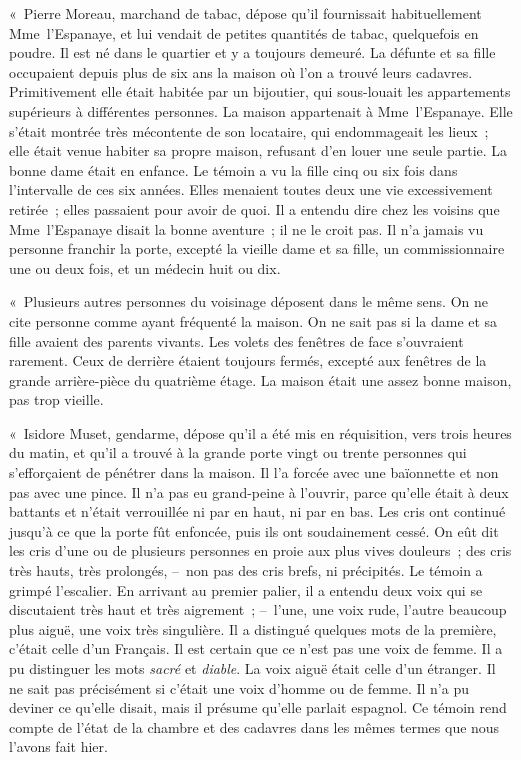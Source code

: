 \documentclass[french,twoside]{book} %
\begin{document}
« Pierre Moreau, marchand de tabac, dépose qu’il fournissait habituellement Mme l’Espanaye, et lui vendait de petites quantités de tabac, quelquefois en poudre. Il est né dans le quartier et y a toujours demeuré. La défunte et sa fille occupaient depuis plus de six ans la maison où l’on a trouvé leurs cadavres. Primitivement elle était habitée par un bijoutier, qui sous-louait les appartements supérieurs à différentes personnes. La maison appartenait à Mme l’Espanaye. Elle s’était montrée très mécontente de son locataire, qui endommageait les lieux ; elle était venue habiter sa propre maison, refusant d’en louer une seule partie. La bonne dame était en enfance. Le témoin a vu la fille cinq ou six fois dans l’intervalle de ces six années. Elles menaient toutes deux une vie excessivement retirée ; elles passaient pour avoir de quoi. Il a entendu dire chez les voisins que Mme l’Espanaye disait la bonne aventure ; il ne le croit pas. Il n’a jamais vu personne franchir la porte, excepté la vieille dame et sa fille, un commissionnaire une ou deux fois, et un médecin huit ou dix.\par
« Plusieurs autres personnes du voisinage déposent dans le même sens. On ne cite personne comme ayant fréquenté la maison. On ne sait pas si la dame et sa fille avaient des parents vivants. Les volets des fenêtres de face s’ouvraient rarement. Ceux de derrière étaient toujours fermés, excepté aux fenêtres de la grande arrière-pièce du quatrième étage. La maison était une assez bonne maison, pas trop vieille.\par
« Isidore Muset, gendarme, dépose qu’il a été mis en réquisition, vers trois heures du matin, et qu’il a trouvé à la grande porte vingt ou trente personnes qui s’efforçaient de pénétrer dans la maison. Il l’a forcée avec une baïonnette et non pas avec une pince. Il n’a pas eu grand-peine à l’ouvrir, parce qu’elle était à deux battants et n’était verrouillée ni par en haut, ni par en bas. Les cris ont continué jusqu’à ce que la porte fût enfoncée, puis ils ont soudainement cessé. On eût dit les cris d’une ou de plusieurs personnes en proie aux plus vives douleurs ; des cris très hauts, très prolongés, – non pas des cris brefs, ni précipités. Le témoin a grimpé l’escalier. En arrivant au premier palier, il a entendu deux voix qui se discutaient très haut et très aigrement ; – l’une, une voix rude, l’autre beaucoup plus aiguë, une voix très singulière. Il a distingué quelques mots de la première, c’était celle d’un Français. Il est certain que ce n’est pas une voix de femme. Il a pu distinguer les mots \emph{sacré} et \emph{diable}. La voix aiguë était celle d’un étranger. Il ne sait pas précisément si c’était une voix d’homme ou de femme. Il n’a pu deviner ce qu’elle disait, mais il présume qu’elle parlait espagnol. Ce témoin rend compte de l’état de la chambre et des cadavres dans les mêmes termes que nous l’avons fait hier.\par
\end{document}
